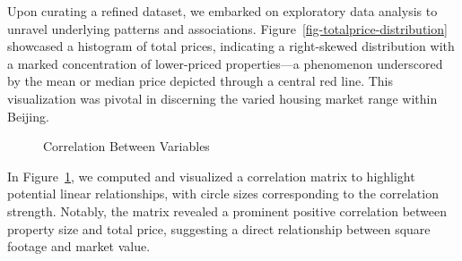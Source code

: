 \documentclass[
  letterpaper,
  DIV=11,
  numbers=noendperiod]{scrartcl}
\begin{document}
Upon curating a refined dataset, we embarked on exploratory data
analysis to unravel underlying patterns and associations.
Figure~\ref{fig-totalprice-distribution} showcased a histogram of total
prices, indicating a right-skewed distribution with a marked
concentration of lower-priced properties---a phenomenon underscored by
the mean or median price depicted through a central red line. This
visualization was pivotal in discerning the varied housing market range
within Beijing.

\begin{figure}


\caption{\label{fig-correlation}Correlation Between Variables}

\end{figure}%

In Figure~\ref{fig-correlation}, we computed and visualized a
correlation matrix to highlight potential linear relationships, with
circle sizes corresponding to the correlation strength. Notably, the
matrix revealed a prominent positive correlation between property size
and total price, suggesting a direct relationship between square footage
and market value.
\end{document}
